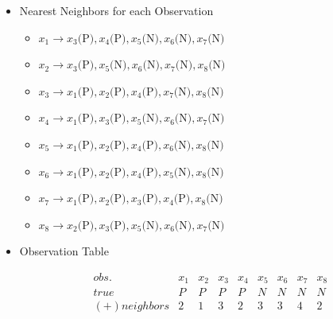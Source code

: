 \documentclass[12pt]{article}
\begin{document}
\begin{enumerate}[leftmargin=\labelsep, label=\textbf{\arabic*.)}]
\begin{itemize}
                \vspace{0.5em}
              \item Nearest Neighbors for each Observation
                    \vspace{0.5em}
                    \begin{itemize}
                        \item \( x_1 \rightarrow x_3\text{(P)}, x_4\text{(P)}, x_5\text{(N)}, x_6\text{(N)}, x_7\text{(N)} \)
                        \item \( x_2 \rightarrow x_3\text{(P)}, x_5\text{(N)}, x_6\text{(N)}, x_7\text{(N)}, x_8\text{(N)} \)
                        \item \( x_3 \rightarrow x_1\text{(P)}, x_2\text{(P)}, x_4\text{(P)}, x_7\text{(N)}, x_8\text{(N)} \)
                        \item \( x_4 \rightarrow x_1\text{(P)}, x_3\text{(P)}, x_5\text{(N)}, x_6\text{(N)}, x_7\text{(N)} \)
                        \item \( x_5 \rightarrow x_1\text{(P)}, x_2\text{(P)}, x_4\text{(P)}, x_6\text{(N)}, x_8\text{(N)} \)
                        \item \( x_6 \rightarrow x_1\text{(P)}, x_2\text{(P)}, x_4\text{(P)}, x_5\text{(N)}, x_8\text{(N)} \)
                        \item \( x_7 \rightarrow x_1\text{(P)}, x_2\text{(P)}, x_3\text{(P)}, x_4\text{(P)}, x_8\text{(N)} \)
                        \item \( x_8 \rightarrow x_2\text{(P)}, x_3\text{(P)}, x_5\text{(N)}, x_6\text{(N)}, x_7\text{(N)} \)
                    \end{itemize}
                \vspace{0.5em}
              \item Observation Table \\
                    \vspace{0.5em}
                    \begin{minipage}{1\textwidth}
                        \[
                            \begin{array}{|c|c|c|c|c|c|c|c|c|}
                                \hline
                                obs.          & x_1 & x_2 & x_3 & x_4 & x_5 & x_6 & x_7 & x_8 \\
                                \hline
                                true          & P   & P   & P   & P   & N   & N   & N   & N   \\
                                (+) neighbors & 2   & 1   & 3   & 2   & 3   & 3   & 4   & 2   \\

\end{array}\]
\end{minipage}
\end{itemize}
\end{enumerate}
\end{document}
